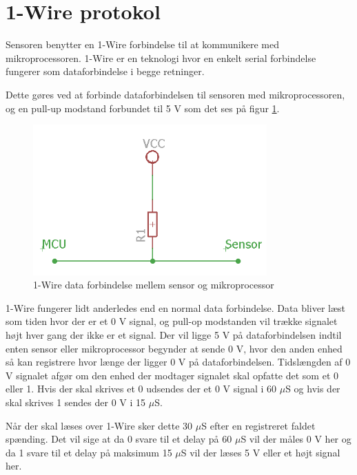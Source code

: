 \section{1-Wire protokol}
Sensoren benytter en 1-Wire forbindelse til at kommunikere med mikroprocessoren. 1-Wire er en teknologi hvor en  enkelt serial forbindelse fungerer som dataforbindelse i begge retninger. 

Dette gøres ved at forbinde dataforbindelsen til sensoren med mikroprocessoren, og en pull-up modstand forbundet til 5 V som det ses på figur \ref{one_wire_schematic}. 


\begin{figure}[h!]
  \centering
  \includegraphics[width=0.8\textwidth]{figures/onewire_eksempel.png}
  \caption{1-Wire data forbindelse mellem sensor og mikroprocessor}
  \label{one_wire_schematic}
\end{figure}

1-Wire fungerer lidt anderledes end en normal data forbindelse. Data bliver læst som tiden hvor der er et 0 V signal, og pull-op modstanden vil trække signalet højt hver gang der ikke er et signal. Der vil ligge 5 V på dataforbindelsen indtil enten sensor eller mikroprocessor begynder at sende 0 V, hvor den anden enhed så kan registrere hvor længe der ligger 0 V på dataforbindelsen. Tidslængden af 0 V signalet afgør om den enhed der modtager signalet skal opfatte det som et 0 eller 1. Hvis der skal skrives et 0 udsendes der et 0 V signal i 60 $\mu$S og hvis der skal skrives 1 sendes der 0 V i 15 $\mu$S. 

Når der skal læses over 1-Wire sker dette 30 $\mu$S efter en registreret faldet spænding. Det vil sige at da 0 svare til et delay på 60 $\mu$S vil der måles 0 V her og da 1 svare til et delay på maksimum 15 $\mu$S vil der læses 5 V eller et højt signal her.


